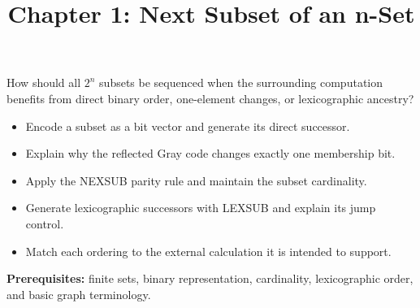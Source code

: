 \documentclass[10pt,letterpaper]{article}
\title{Chapter 1: Next Subset of an n-Set}
\author{}
\date{}
\begin{document}
\maketitle
{}
\begin{tcolorbox}[colback=Teal!5,colframe=Teal,title=Essential question]
How should all $2^n$ subsets be sequenced when the surrounding computation benefits from direct binary order, one-element changes, or lexicographic ancestry?
\end{tcolorbox}
\begin{tcolorbox}[colback=white,colframe=Mist,title=Learning objectives]
\begin{itemize}
\item Encode a subset as a bit vector and generate its direct successor.
\item Explain why the reflected Gray code changes exactly one membership bit.
\item Apply the NEXSUB parity rule and maintain the subset cardinality.
\item Generate lexicographic successors with LEXSUB and explain its jump control.
\item Match each ordering to the external calculation it is intended to support.
\end{itemize}
\textbf{Prerequisites:} finite sets, binary representation, cardinality, lexicographic order, and basic graph terminology.
\end{tcolorbox}
\end{document}
